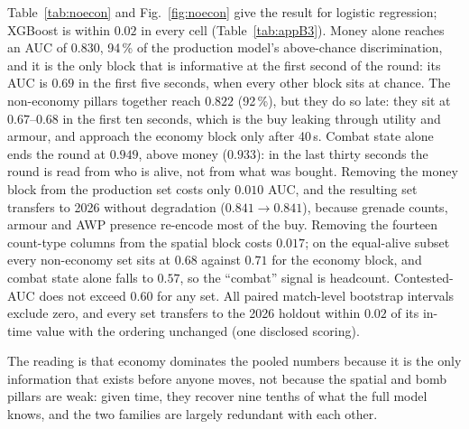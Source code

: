 \documentclass[11pt,a4paper]{article}
\begin{document}
Table~\ref{tab:noecon} and Fig.~\ref{fig:noecon} give the result for logistic regression; XGBoost is
within $0.02$ in every cell (Table~\ref{tab:appB3}). Money alone reaches an AUC of $0.830$, 94\,\% of
the production model's above-chance discrimination, and it is the only block that is informative at
the first second of the round: its AUC is $0.69$ in the first five seconds, when every other block sits
at chance. The non-economy pillars together reach $0.822$ (92\,\%), but they do so late: they sit at
$0.67$--$0.68$ in the first ten seconds, which is the buy leaking through utility and armour, and
approach the economy block only after 40\,s. Combat state alone ends the round at $0.949$, above money
($0.933$): in the last thirty seconds the round is read from who is alive, not from what was bought.
Removing the money block from the production set costs only $0.010$ AUC, and the resulting set
transfers to 2026 without degradation ($0.841 \to 0.841$), because grenade counts, armour and AWP
presence re-encode most of the buy. Removing the fourteen count-type columns from the spatial block
costs $0.017$; on the equal-alive subset every non-economy set sits at $0.68$ against $0.71$ for the
economy block, and combat state alone falls to $0.57$, so the ``combat'' signal is headcount.
Contested-AUC does not exceed $0.60$ for any set. All paired match-level bootstrap intervals exclude
zero, and every set transfers to the 2026 holdout within $0.02$ of its in-time value with the ordering
unchanged (one disclosed scoring).

The reading is that economy dominates the pooled numbers because it is the only information that
exists before anyone moves, not because the spatial and bomb pillars are weak: given time, they recover
nine tenths of what the full model knows, and the two families are largely redundant with each other.
\end{document}
